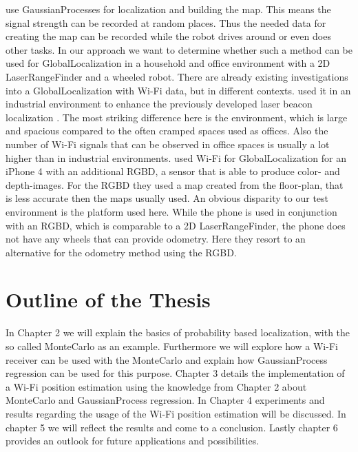 \citet{ferris2006gaussian} use \Gls{GaussianProcess}es for localization and building the map. This means the signal strength can be recorded at random places. Thus the needed data for creating the map can be recorded while the robot drives around or even does other tasks. 
In our approach we want to determine whether such a method can be used for \gls{GlobalLocalization} in a household and office environment with a 2D \gls{LaserRangeFinder} and a wheeled robot.
There are already existing investigations into a \gls{GlobalLocalization} with Wi-Fi data, but in different contexts. \citet{duvallet2008wifi} used it in an industrial environment to enhance the previously developed laser beacon localization \citep{4209248}. The most striking difference here is the environment, which is large and spacious compared to the often cramped spaces used as offices. Also the number of Wi-Fi signals that can be observed in office spaces is usually a lot higher than in industrial environments.
\citet{DBLP:conf/icra/ItoEKTSB14} used Wi-Fi for \gls{GlobalLocalization} for an iPhone 4 with an additional \Gls{RGBD}, a sensor that is able to produce color- and depth-images. For the \Gls{RGBD} they used a map created from the floor-plan, that is less accurate then the maps usually used. An obvious disparity to our test environment is the platform used here. While the phone is used in conjunction with an \Gls{RGBD}, which is comparable to a 2D \gls{LaserRangeFinder}, the phone does not have any wheels that can provide odometry. Here they resort to an alternative for the odometry method using the \Gls{RGBD}.  

\section{Outline of the Thesis}
In Chapter 2 we will explain the basics of probability based localization, with the so called \Gls{MonteCarlo} \citep{Dellaert_1999_533} as an example. 
Furthermore we will explore how a Wi-Fi receiver can be used with the \Gls{MonteCarlo} and explain how \Gls{GaussianProcess} regression \citep{Rasmussen:2005:GPM:1162254} can be used for this purpose.
Chapter 3 details the implementation of a Wi-Fi position estimation using the knowledge from Chapter 2 about \Gls{MonteCarlo} and \Gls{GaussianProcess} regression.
In Chapter 4 experiments and results regarding the usage of the Wi-Fi position estimation will be discussed.
In chapter 5 we will reflect the results and come to a conclusion. 
Lastly chapter 6 provides an outlook for future applications and possibilities.